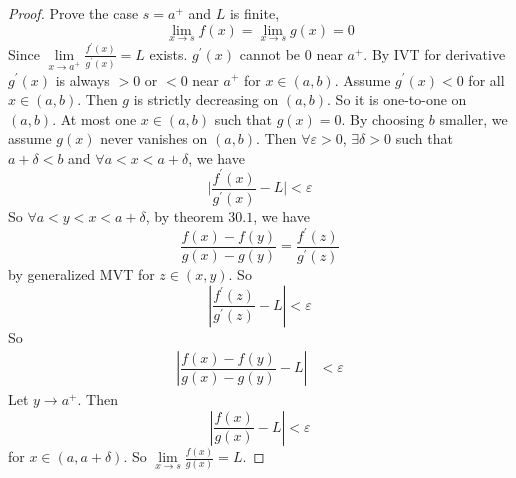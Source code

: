 \documentclass{report}
\begin{document}
    \begin{proof}
        Prove the case $s = a^{+}$ and $L$ is finite, 
            \begin{equation*}
                \lim\limits_{x \to s}f(x) = \lim\limits_{x \to s}g(x) = 0
            \end{equation*}
        Since $\lim\limits_{x \to a^{+}}\frac{f^{\prime}(x)}{g^{\prime}(x)} = L$ exists. $g^{\prime}(x)$ cannot be $0$ near $a^{+}$. By IVT for derivative $g^{\prime}(x)$ is always $> 0$ or $< 0$ near $a^{+}$ for $x \in (a, b)$. Assume $g^{\prime}(x) < 0$ for all $x \in (a, b)$. Then $g$ is strictly decreasing on $(a, b)$. So it is one-to-one on $(a, b)$. At most one $x \in (a, b)$ such that $g(x) = 0$. By choosing $b$ smaller, we assume $g(x)$ never vanishes on $(a, b)$. Then $\forall \varepsilon> 0$, $\exists \delta> 0$ such that $a + \delta < b$ and $\forall a < x < a + \delta$, we have 
            \begin{equation*}
                \lvert \dfrac{f^{\prime}(x)}{g^{\prime}(x)} - L \rvert < \varepsilon
            \end{equation*}
        So $\forall a  < y < x < a + \delta$, by theorem $30.1$, we have
            \begin{equation*}
                \dfrac{f(x) - f(y)}{g(x) - g(y)} = \dfrac{f^{\prime}(z)}{g^{\prime}(z)}
            \end{equation*}
        by generalized MVT for $z \in (x, y)$. So 
            \begin{equation*}
                \left\lvert \dfrac{f^{\prime}(z)}{g^{\prime}(z)} - L \right\rvert < \varepsilon
            \end{equation*}
        So
            \begin{align*}
                \left\lvert \dfrac{f(x) - f(y)}{g(x) - g(y)} - L \right\rvert &< \varepsilon   
            \end{align*} 
        Let $y \rightarrow a^{+}$. Then 
            \begin{equation*}
                \left\lvert \dfrac{f(x)}{g(x)} - L \right\rvert < \varepsilon
            \end{equation*}
        for $x \in (a, a+ \delta)$. So $\lim\limits_{x \to s}\frac{f(x)}{g(x)} = L$.
    \end{proof}
\end{document}
